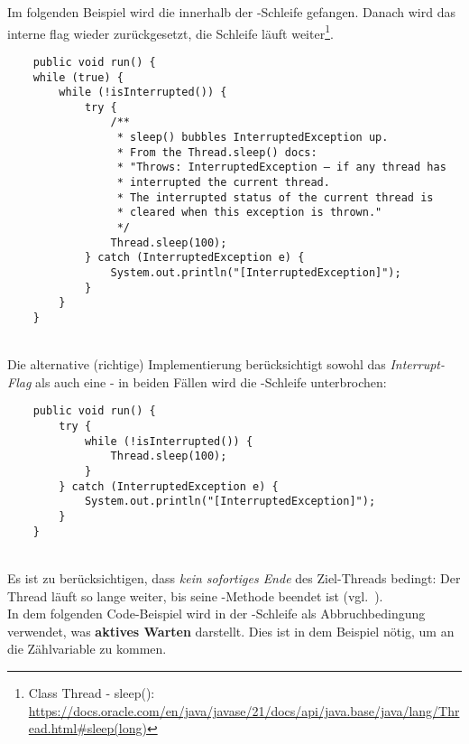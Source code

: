 \noindent
Im folgenden Beispiel wird die  innerhalb der -Schleife gefangen.
Danach wird das interne flag wieder zurückgesetzt, die Schleife läuft weiter\footnote{
    Class Thread - sleep(): \url{https://docs.oracle.com/en/java/javase/21/docs/api/java.base/java/lang/Thread.html#sleep(long)}
}.
\begin{verbatim}
    public void run() {
    while (true) {
        while (!isInterrupted()) {
            try {
                /**
                 * sleep() bubbles InterruptedException up.
                 * From the Thread.sleep() docs:
                 * "Throws: InterruptedException – if any thread has
                 * interrupted the current thread.
                 * The interrupted status of the current thread is
                 * cleared when this exception is thrown."
                 */
                Thread.sleep(100);
            } catch (InterruptedException e) {
                System.out.println("[InterruptedException]");
            }
        }
    }
\end{verbatim}\\

\noindent
Die alternative (richtige) Implementierung berücksichtigt sowohl das \textit{Interrupt-Flag} als auch eine  - in beiden Fällen wird die -Schleife unterbrochen:

\begin{verbatim}
    public void run() {
        try {
            while (!isInterrupted()) {
                Thread.sleep(100);
            }
        } catch (InterruptedException e) {
            System.out.println("[InterruptedException]");
        }
    }
\end{verbatim}\\

Es ist zu berücksichtigen, dass  \textit{kein sofortiges Ende} des Ziel-Threads bedingt: Der Thread läuft so lange weiter, bis seine -Methode beendet ist (vgl.~\cite[44 f.]{Oec22}).\\
In dem folgenden Code-Beispiel wird in der -Schleife  als Abbruchbedingung verwendet, was \textbf{aktives Warten} darstellt.
Dies ist in dem Beispiel nötig, um an die Zählvariable zu kommen.


